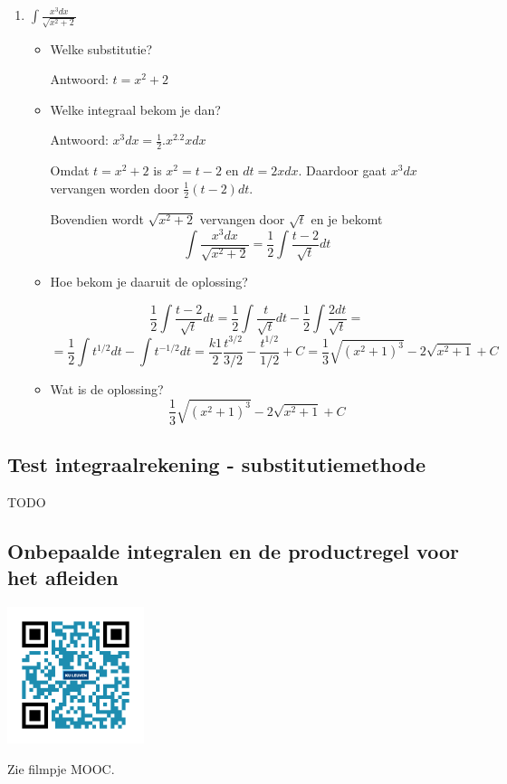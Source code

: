 \begin{enumerate}
\begin{itemize}
	\end{itemize}
	
	\item $\int \frac{x^3dx}{\sqrt{x^2+2}}$
	
	\begin{itemize}
		\item Welke substitutie?
		
		Antwoord: $t=x^2+2$
		
		\item Welke integraal bekom je dan?
		
		Antwoord: $x^3dx=\frac{1}{2}.x^2.2xdx$
		
		Omdat $t=x^2+2$ is $x^2=t-2$ en $dt=2xdx$.
		Daardoor gaat $x^3dx$ vervangen worden door $\frac{1}{2}(t-2)dt$.
		
		Bovendien wordt $\sqrt{x^2+2}$ vervangen door $\sqrt{t}$ en je bekomt
		\[
		\int \frac{x^3dx}{\sqrt{x^2+2}}=\frac{1}{2} \int \frac{t-2}{\sqrt{t}}dt
		\]
		
		\item Hoe bekom je daaruit de oplossing?
		
		\[
		\frac{1}{2} \int \frac{t-2}{\sqrt{t}}dt=\frac{1}{2} \int \frac{t}{\sqrt{t}}dt - \frac{1}{2}\int \frac{2dt}{\sqrt{t}}=
		\]
		\[
		=\frac{1}{2} \int t^{1/2}dt - \int t^{-1/2}dt=\frac{k1}{2}\frac{t^{3/2}}{3/2}-\frac{t^{1/2}}{1/2}+C=\frac{1}{3} \sqrt{(x^2+1)^3}-2\sqrt{x^2+1}+C
		\]
		
		\item Wat is de oplossing?
		\[
		\frac{1}{3} \sqrt{(x^2+1)^3}-2\sqrt{x^2+1}+C
		\]
		
	\end{itemize}
	
\end{enumerate}


\subsection{Test integraalrekening - substitutiemethode}
TODO

\subsection{Onbepaalde integralen en de productregel voor het afleiden}
\begin{minipage}{.25\linewidth}
	\raggedright
	\includegraphics[width=4cm]{6_afgeleiden_integralen/inputs/QR_Code_ONBEPPRODUCTREGEL_module6_3}
\end{minipage}
\begin{minipage}{.7\linewidth}
	Zie filmpje MOOC.
\end{minipage}


